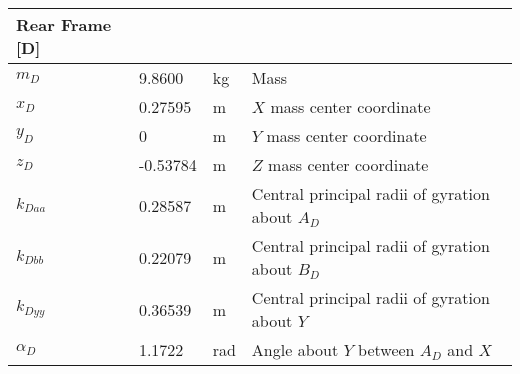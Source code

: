 \documentclass{bmd2019a}
\begin{document}
\begin{table}
\begin{tabular}{llll}
    Rear Frame [D] & & \\
    \midrule
    $m_D$ &  9.8600 & \si{\kilogram}    & Mass \\
    $x_D$ &  0.27595 & \si{\meter}      & $X$ mass center coordinate \\
    $y_D$ & 0 & \si{\meter}             & $Y$ mass center coordinate \\
    $z_D$ & -0.53784 & \si{\meter}      & $Z$ mass center coordinate \\
    $k_{Daa}$ &  0.28587 & \si{\meter}  & Central principal radii of gyration about $A_D$ \\
    $k_{Dbb}$ &  0.22079 & \si{\meter}  & Central principal radii of gyration about $B_D$ \\
    $k_{Dyy}$ &  0.36539 & \si{\meter}  & Central principal radii of gyration about $Y$ \\
    $\alpha_D$ &  1.1722 & \si{\radian} & Angle about $Y$ between $A_D$ and $X$ \\
    \bottomrule
  \end{tabular}
\end{table}
\end{document}

